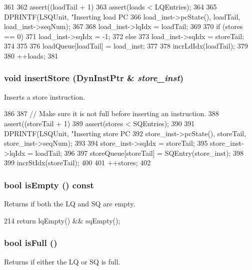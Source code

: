 \begin{DoxyCode}
361 {
362     assert((loadTail + 1) %
363     assert(loads < LQEntries);
364 
365     DPRINTF(LSQUnit, "Inserting load PC %
366             load_inst->pcState(), loadTail, load_inst->seqNum);
367 
368     load_inst->lqIdx = loadTail;
369 
370     if (stores == 0) {
371         load_inst->sqIdx = -1;
372     } else {
373         load_inst->sqIdx = storeTail;
374     }
375 
376     loadQueue[loadTail] = load_inst;
377 
378     incrLdIdx(loadTail);
379 
380     ++loads;
381 }
\end{DoxyCode}
\hypertarget{classLSQUnit_a6a4b4e51bfff3639932ebaba45e8a282}{
\subsubsection[{insertStore}]{\setlength{\rightskip}{0pt plus 5cm}void insertStore ({\bf DynInstPtr} \& {\em store\_\-inst})}}
\label{classLSQUnit_a6a4b4e51bfff3639932ebaba45e8a282}
Inserts a store instruction. 


\begin{DoxyCode}
386 {
387     // Make sure it is not full before inserting an instruction.
388     assert((storeTail + 1) %
389     assert(stores < SQEntries);
390 
391     DPRINTF(LSQUnit, "Inserting store PC %
392             store_inst->pcState(), storeTail, store_inst->seqNum);
393 
394     store_inst->sqIdx = storeTail;
395     store_inst->lqIdx = loadTail;
396 
397     storeQueue[storeTail] = SQEntry(store_inst);
398 
399     incrStIdx(storeTail);
400 
401     ++stores;
402 }
\end{DoxyCode}
\hypertarget{classLSQUnit_a479432127ee77145cc19d6a2d1590821}{
\subsubsection[{isEmpty}]{\setlength{\rightskip}{0pt plus 5cm}bool isEmpty () const}}
\label{classLSQUnit_a479432127ee77145cc19d6a2d1590821}
Returns if both the LQ and SQ are empty. 


\begin{DoxyCode}
214 { return lqEmpty() && sqEmpty(); }
\end{DoxyCode}
\hypertarget{classLSQUnit_a3e70330939fdfc4dbc2f60c1a660584d}{
\subsubsection[{isFull}]{\setlength{\rightskip}{0pt plus 5cm}bool isFull ()}}
\label{classLSQUnit_a3e70330939fdfc4dbc2f60c1a660584d}
Returns if either the LQ or SQ is full. 


